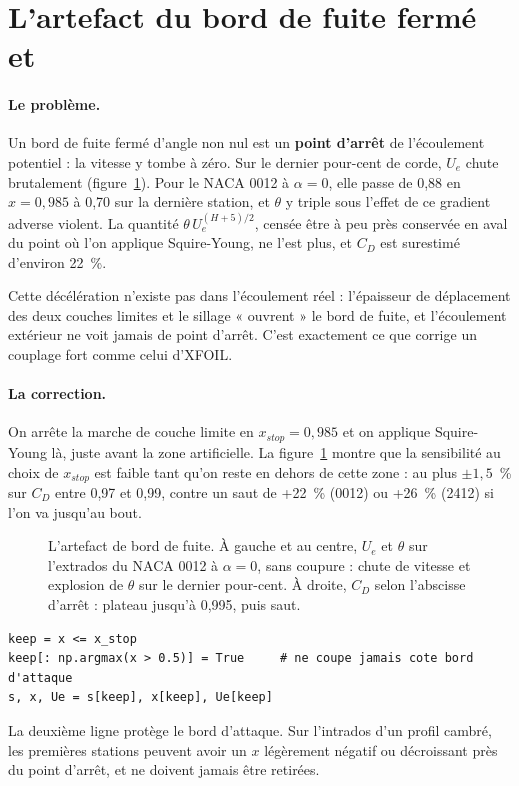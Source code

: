 \section{L'artefact du bord de fuite fermé et }
\paragraph{Le problème.} Un bord de fuite fermé d'angle non nul est un \textbf{point d'arrêt} de l'écoulement potentiel : la vitesse y tombe à zéro. Sur le dernier pour-cent de corde, $U_e$ chute brutalement (figure~\ref{fig:bf}). Pour le NACA 0012 à $\alpha=0$, elle passe de 0,88 en $x=0{,}985$ à 0,70 sur la dernière station, et $\theta$ y triple sous l'effet de ce gradient adverse violent. La quantité $\theta\,U_e^{(H+5)/2}$, censée être à peu près conservée en aval du point où l'on applique Squire-Young, ne l'est plus, et $C_D$ est surestimé d'environ 22~\%.

Cette décélération n'existe pas dans l'écoulement réel : l'épaisseur de déplacement des deux couches limites et le sillage « ouvrent » le bord de fuite, et l'écoulement extérieur ne voit jamais de point d'arrêt. C'est exactement ce que corrige un couplage fort comme celui d'XFOIL.

\paragraph{La correction.} On arrête la marche de couche limite en $x_{stop}=0{,}985$ et on applique Squire-Young là, juste avant la zone artificielle. La figure~\ref{fig:bf} montre que la sensibilité au choix de $x_{stop}$ est faible tant qu'on reste en dehors de cette zone : au plus $\pm1{,}5$~\% sur $C_D$ entre 0,97 et 0,99, contre un saut de +22~\% (0012) ou +26~\% (2412) si l'on va jusqu'au bout.

\begin{figure}[htbp]
\centering

\caption{L'artefact de bord de fuite. À gauche et au centre, $U_e$ et $\theta$ sur l'extrados du NACA 0012 à $\alpha=0$, sans coupure : chute de vitesse et explosion de $\theta$ sur le dernier pour-cent. À droite, $C_D$ selon l'abscisse d'arrêt : plateau jusqu'à 0,995, puis saut.}\label{fig:bf}
\end{figure}

\begin{codebox}
\begin{lstlisting}
keep = x <= x_stop
keep[: np.argmax(x > 0.5)] = True     # ne coupe jamais cote bord d'attaque
s, x, Ue = s[keep], x[keep], Ue[keep]
\end{lstlisting}
La deuxième ligne protège le bord d'attaque. Sur l'intrados d'un profil cambré, les premières stations peuvent avoir un $x$ légèrement négatif ou décroissant près du point d'arrêt, et ne doivent jamais être retirées.
\end{codebox}

